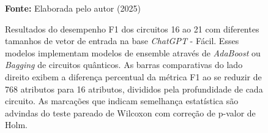 \begin{figure}
\caption{Resultados do desempenho F1 dos circuitos 16 ao 21 com diferentes tamanhos de vetor de entrada na base \textit{ChatGPT} - Fácil. Esses modelos implementam modelos de ensemble através de \textit{AdaBoost} ou \textit{Bagging} de circuitos quânticos. As barras comparativas do lado direito exibem a diferença percentual da métrica F1 ao se reduzir de 768 atributos para 16 atributos, divididos pela profundidade de cada circuito. As marcações que indicam semelhança estatística são advindas do teste pareado de Wilcoxon com correção de p-valor de Holm.}
\label{fig:n_features:easy:g6}
     \centering
    \centering
      \par\medskip\ABNTEXfontereduzida\selectfont\textbf{Fonte:} Elaborada pelo autor (2025) \par\medskip
\end{figure}